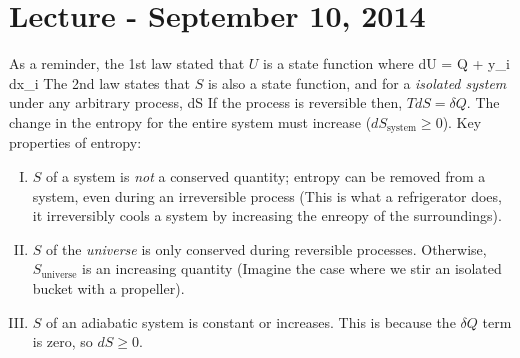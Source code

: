 \documentclass[12pt]{article}
\begin{document}
\section{Lecture - September 10, 2014}
As a reminder, the 1st law stated that $U$ is a state function where
\beq
dU = \delta Q + \sum y_i dx_i
\ceq
The 2nd law states that $S$ is also a state function, and for a \emph{isolated system} under any arbitrary process,
\beq dS \geq {} \ceq
If the process is reversible then, $TdS = \delta Q$.  The change in the entropy for the entire system must increase ($dS_\text{system} \geq 0$).
Key properties of entropy:
\begin{enumerate}[(I)]
\item $S$ of a system is \emph{not} a conserved quantity; entropy can be removed from a system, even during an irreversible process (This is what a refrigerator does, it irreversibly cools a system by increasing the enreopy of the surroundings). 
\item $S$ of the \emph{universe} is only conserved during reversible processes. Otherwise, $S_\text{universe}$ is an increasing quantity (Imagine the case where we stir an isolated bucket with a propeller).
\item $S$ of an adiabatic system is constant or increases.  This is because the $\delta Q$ term is zero, so $dS \geq 0$. %
\end{enumerate}
\end{document}
